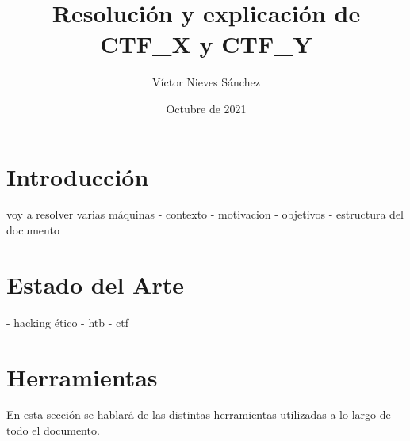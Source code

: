 \documentclass[a4paper, 12pt]{article} %
\author{Víctor Nieves Sánchez}
\date{Octubre de 2021}
\title{Resolución y explicación de CTF\_X y CTF\_Y}
\begin{document}
\maketitle
\null
\newpage
\begin{otherlanguage}{spanish}



    \newpage
    \tableofcontents

    \newpage
    \listoffigures

    \newpage
    \renewcommand{\listtablename}{Lista de Tablas}
    \listoftables

    \newpage
    \lstlistoflistings

    \newpage
    \printglossary[type=\acronymtype]

    \newpage
    \begin{abstract}
        \normalsize
        
    \end{abstract}

    \newpage
        \renewcommand{\spanishabstractname}{Abstract}
        \begin{abstract}
            \normalsize
            
        \end{abstract}
    \newpage

    \section{Introducción}
        voy a resolver varias máquinas
        - contexto
        - motivacion
        - objetivos
        - estructura del documento
    
    \newpage
    \section{Estado del Arte}
    - hacking ético
    - htb
    - ctf
    
    \newpage
    \section{Herramientas}
    En esta sección se hablará de las distintas herramientas utilizadas a lo largo de todo el documento.
    

\end{otherlanguage}
\end{document}
